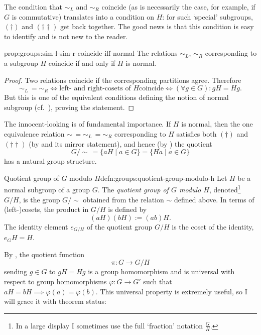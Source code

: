 The condition that $\sim_L$ and $\sim_R$ coincide (as is necessarily
the case, for example, if $G$ is commutative) translates into a
condition on $H$: for such `special' subgroups, $(\dagger)$ and
$(\dagger\dagger)$ get back together. The good news is that this
condition is easy to identify and is not new to the reader.

\begin{prop}{}{prop:groups:sim-l-sim-r-coincide-iff-normal}
  The relations $\sim_L$, $\sim_R$ corresponding to a
    subgroup $H$ coincide if and only if $H$ is
    normal.
\end{prop}
\begin{proof}
  Two relations coincide if the corresponding partitions agree.
  Therefore
  \[
    \sim_L\, = \sim_R \iff \text{left- and right-cosets of } H \text{
      coincide} \iff (\forall g \in G) : gH = Hg.
  \]
  But this is one of the equivalent conditions defining the notion of
  normal subgroup (cf.\ ),
  proving the statement.
\end{proof}

The innocent-looking
 is of
fundamental importance. If $H$ is normal, then the one equivalence
relation $\sim\, = \sim_L\, = \sim_R$ corresponding to $H$ satisfies
both $(\dagger)$ and $(\dagger\dagger)$ (by
 and its mirror
statement), and hence (by
) the
quotient
\[
  G/\!\sim\, = \{aH \mid a \in G\} = \{Ha \mid a \in G\}
\]
has a natural group structure.

\begin{defn}{Quotient group of $G$ modulo $H$}{defn:groups:quotient-group-modulo-h}
  Let $H$ be a normal subgroup of a group $G$. The \emph{quotient
    group of $G$ modulo $H$}, denoted\footnote{In a large display I
    sometimes use the full `fraction' notation $\frac{G}{H}$.} $G/H$,
  is the group $G/\!\sim$ obtained from the relation $\sim$ defined
  above. In terms of (left-)cosets, the product in $G/H$ is defined by
  \[
    (aH)(bH) := (ab)H.
  \]
  The identity element $e_{G/H}$ of the quotient group $G/H$ is the
  coset of the identity, $e_GH = H$.
\end{defn}

By ,
the quotient function
\[
  \pi : G \to G/H
\]
sending $g \in G$ to $gH = Hg$ is a group homomorphism and is
universal with respect to group homomorphisms $\varphi : G \to G'$
such that $aH = bH \implies \varphi(a) = \varphi(b)$. This universal
property is extremely useful, so I will grace it with theorem status:

